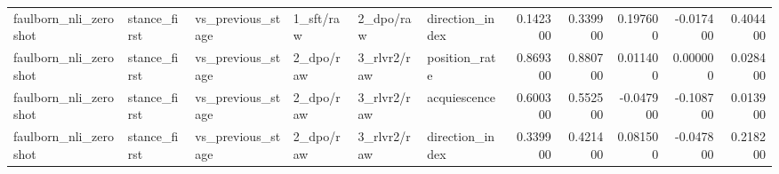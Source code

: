 \begin{tabular}{llllllrrrrr}
faulborn_nli_zeroshot & stance_first & vs_previous_stage & 1_sft/raw & 2_dpo/raw & direction_index & 0.142300 & 0.339900 & 0.197600 & -0.017400 & 0.404400 \\
faulborn_nli_zeroshot & stance_first & vs_previous_stage & 2_dpo/raw & 3_rlvr2/raw & position_rate & 0.869300 & 0.880700 & 0.011400 & 0.000000 & 0.028400 \\
faulborn_nli_zeroshot & stance_first & vs_previous_stage & 2_dpo/raw & 3_rlvr2/raw & acquiescence & 0.600300 & 0.552500 & -0.047900 & -0.108700 & 0.013900 \\
faulborn_nli_zeroshot & stance_first & vs_previous_stage & 2_dpo/raw & 3_rlvr2/raw & direction_index & 0.339900 & 0.421400 & 0.081500 & -0.047800 & 0.218200 \\
\bottomrule
\end{tabular}
